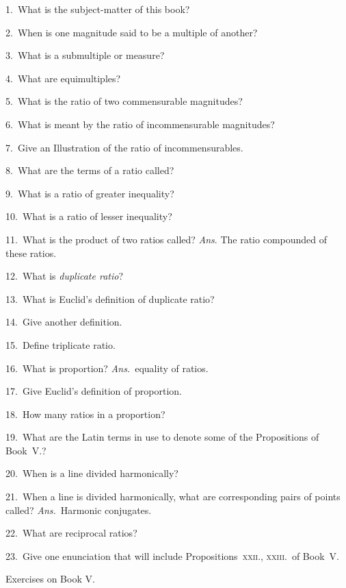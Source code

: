 \documentclass[oneside]{book}
\newcommand\exhead[1]{
\Needspace*{5\baselineskip}\begin{center}
\textsf{#1}
\end{center}
}
\begin{document}
\begin{footnotesize}
1.~What is the subject-matter of this book?

2.~When is one magnitude said to be a multiple of another?

3.~What is a submultiple or measure?

4.~What are equimultiples?

5.~What is the ratio of two commensurable magnitudes?

6.~What is meant by the ratio of incommensurable magnitudes?

7.~Give an Illustration of the ratio of incommensurables.

8.~What are the terms of a ratio called?

9.~What is a ratio of greater inequality?

10.~What is a ratio of lesser inequality?

11.~What is the product of two ratios called? \textit{Ans}. The ratio
compounded of these ratios.



12.~What is \emph{duplicate ratio}?

13.~What is Euclid's definition of duplicate ratio?

14.~Give another definition.

15.~Define triplicate ratio.

16.~What is proportion?  \emph{Ans.}\ equality of ratios.

17.~Give Euclid's definition of proportion.

18.~How many ratios in a proportion?

19.~What are the Latin terms in use to denote some of the
Propositions of Book~V.?

20.~When is a line divided harmonically?

21.~When a line is divided harmonically, what are corresponding
pairs of points called? \emph{Ans.}\ Harmonic conjugates.

22.~What are reciprocal ratios?

23.~Give one enunciation that will include Propositions~\textsc{xxii.},
\textsc{xxiii.}\ of Book~V.
\par\end{footnotesize}

\exhead{Exercises on Book V.}
\end{document}

